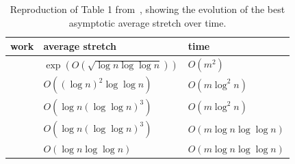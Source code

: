\begin{table}[htbp]
  \centering
  \caption{Reproduction of Table 1 from~\autocite{Abraham2012}, showing the evolution of the best
  asymptotic average stretch over time.}\label{tab:gtx_related}
  \begin{tabular}{lll}
    \toprule
    work                      & average stretch                          & time                    \\
    \midrule
    \autocite{LowerBound95}   & $\exp(O(\sqrt{\log n\log\log n}))$       & $O(m^2)$                \\
    \autocite{LowerStretch05} & $O((\log n)^2 \log \log n)$              & $O(m \log^2 n)$         \\
    \autocite{nearlyTight08}  & $O(\log n(\log \log n)^3)$              & $O(m \log^2 n)$         \\
    \autocite{TighterSDD11}   & $O(\log n(\log \log n)^3 )$              & $O(m \log n\log\log n)$ \\
    \autocite{Abraham2012}    & $O(\log n \log \log n)$                  & $O(m \log n\log\log n)$ \\
    \bottomrule
  \end{tabular}
\end{table}

